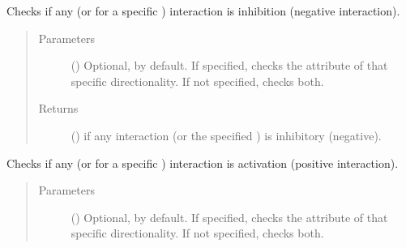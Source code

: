 \documentclass[letterpaper,10pt,english]{sphinxmanual}
\begin{document}
\begin{fulllineitems}
\begin{fulllineitems}
\begin{quote}
\begin{description}
\end{description}\end{quote}

\end{fulllineitems}


\begin{fulllineitems}
\label{\detokenize{main:pypath.main.Direction.is_inhibition}}
Checks if any (or for a specific ) interaction is
inhibition (negative interaction).
\begin{quote}\begin{description}
\item[{Parameters}] \leavevmode
{} () \textendash{} Optional,  by default. If specified, checks the
 attribute of that specific
directionality. If not specified, checks both.

\item[{Returns}] \leavevmode
() \textendash{}  if any interaction (or the specified
) is inhibitory (negative).

\end{description}\end{quote}

\end{fulllineitems}


\begin{fulllineitems}
\label{\detokenize{main:pypath.main.Direction.is_stimulation}}
Checks if any (or for a specific ) interaction is
activation (positive interaction).
\begin{quote}\begin{description}
\item[{Parameters}] \leavevmode
{} () \textendash{} Optional,  by default. If specified, checks the
 attribute of that specific
directionality. If not specified, checks both.


\end{description}
\end{quote}
\end{fulllineitems}
\end{fulllineitems}
\end{document}
